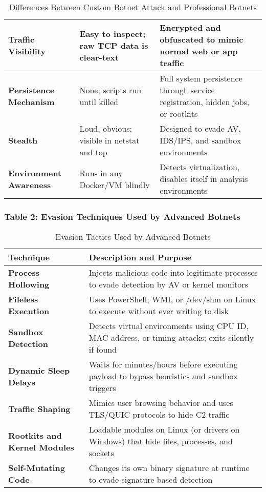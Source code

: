 \documentclass{article}
\begin{document}
\begin{table}[h!]
\begin{tabular}{|p{4.2cm}|p{5.5cm}|p{5.5cm}|}
\hline
\textbf{Traffic Visibility} & Easy to inspect; raw TCP data is clear-text & Encrypted and obfuscated to mimic normal web or app traffic \\
\hline
\textbf{Persistence Mechanism} & None; scripts run until killed & Full system persistence through service registration, hidden jobs, or rootkits \\
\hline
\textbf{Stealth} & Loud, obvious; visible in netstat and top & Designed to evade AV, IDS/IPS, and sandbox environments \\
\hline
\textbf{Environment Awareness} & Runs in any Docker/VM blindly & Detects virtualization, disables itself in analysis environments \\
\hline
\end{tabular}
\caption{Differences Between Custom Botnet Attack and Professional Botnets}
\label{tab:comparison}
\end{table}
\clearpage
\subsubsection*{Table 2: Evasion Techniques Used by Advanced Botnets}
\begin{table}[h!]
\centering
\renewcommand{\arraystretch}{1.4}
\begin{tabular}{|p{5cm}|p{9.5cm}|}
\hline
\rowcolor{blue!15}
\textbf{Technique} & \textbf{Description and Purpose} \\
\hline
\textbf{Process Hollowing} & Injects malicious code into legitimate processes to evade detection by AV or kernel monitors \\
\hline
\textbf{Fileless Execution} & Uses PowerShell, WMI, or /dev/shm on Linux to execute without ever writing to disk \\
\hline
\textbf{Sandbox Detection} & Detects virtual environments using CPU ID, MAC address, or timing attacks; exits silently if found \\
\hline
\textbf{Dynamic Sleep Delays} & Waits for minutes/hours before executing payload to bypass heuristics and sandbox triggers \\
\hline
\textbf{Traffic Shaping} & Mimics user browsing behavior and uses TLS/QUIC protocols to hide C2 traffic \\
\hline
\textbf{Rootkits and Kernel Modules} & Loadable modules on Linux (or drivers on Windows) that hide files, processes, and sockets \\
\hline
\textbf{Self-Mutating Code} & Changes its own binary signature at runtime to evade signature-based detection \\
\hline
\end{tabular}
\caption{Evasion Tactics Used by Advanced Botnets}
\label{tab:evasion}
\end{table}
\end{document}
